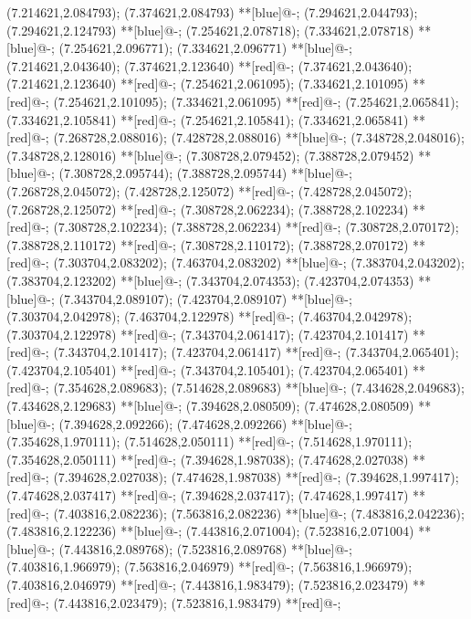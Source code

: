(7.214621,2.084793); (7.374621,2.084793) **[blue]@{-};
(7.294621,2.044793); (7.294621,2.124793) **[blue]@{-};
(7.254621,2.078718); (7.334621,2.078718) **[blue]@{-};
(7.254621,2.096771); (7.334621,2.096771) **[blue]@{-};
(7.214621,2.043640); (7.374621,2.123640) **[red]@{-};
(7.374621,2.043640); (7.214621,2.123640) **[red]@{-};
(7.254621,2.061095); (7.334621,2.101095) **[red]@{-};
(7.254621,2.101095); (7.334621,2.061095) **[red]@{-};
(7.254621,2.065841); (7.334621,2.105841) **[red]@{-};
(7.254621,2.105841); (7.334621,2.065841) **[red]@{-};
(7.268728,2.088016); (7.428728,2.088016) **[blue]@{-};
(7.348728,2.048016); (7.348728,2.128016) **[blue]@{-};
(7.308728,2.079452); (7.388728,2.079452) **[blue]@{-};
(7.308728,2.095744); (7.388728,2.095744) **[blue]@{-};
(7.268728,2.045072); (7.428728,2.125072) **[red]@{-};
(7.428728,2.045072); (7.268728,2.125072) **[red]@{-};
(7.308728,2.062234); (7.388728,2.102234) **[red]@{-};
(7.308728,2.102234); (7.388728,2.062234) **[red]@{-};
(7.308728,2.070172); (7.388728,2.110172) **[red]@{-};
(7.308728,2.110172); (7.388728,2.070172) **[red]@{-};
(7.303704,2.083202); (7.463704,2.083202) **[blue]@{-};
(7.383704,2.043202); (7.383704,2.123202) **[blue]@{-};
(7.343704,2.074353); (7.423704,2.074353) **[blue]@{-};
(7.343704,2.089107); (7.423704,2.089107) **[blue]@{-};
(7.303704,2.042978); (7.463704,2.122978) **[red]@{-};
(7.463704,2.042978); (7.303704,2.122978) **[red]@{-};
(7.343704,2.061417); (7.423704,2.101417) **[red]@{-};
(7.343704,2.101417); (7.423704,2.061417) **[red]@{-};
(7.343704,2.065401); (7.423704,2.105401) **[red]@{-};
(7.343704,2.105401); (7.423704,2.065401) **[red]@{-};
(7.354628,2.089683); (7.514628,2.089683) **[blue]@{-};
(7.434628,2.049683); (7.434628,2.129683) **[blue]@{-};
(7.394628,2.080509); (7.474628,2.080509) **[blue]@{-};
(7.394628,2.092266); (7.474628,2.092266) **[blue]@{-};
(7.354628,1.970111); (7.514628,2.050111) **[red]@{-};
(7.514628,1.970111); (7.354628,2.050111) **[red]@{-};
(7.394628,1.987038); (7.474628,2.027038) **[red]@{-};
(7.394628,2.027038); (7.474628,1.987038) **[red]@{-};
(7.394628,1.997417); (7.474628,2.037417) **[red]@{-};
(7.394628,2.037417); (7.474628,1.997417) **[red]@{-};
(7.403816,2.082236); (7.563816,2.082236) **[blue]@{-};
(7.483816,2.042236); (7.483816,2.122236) **[blue]@{-};
(7.443816,2.071004); (7.523816,2.071004) **[blue]@{-};
(7.443816,2.089768); (7.523816,2.089768) **[blue]@{-};
(7.403816,1.966979); (7.563816,2.046979) **[red]@{-};
(7.563816,1.966979); (7.403816,2.046979) **[red]@{-};
(7.443816,1.983479); (7.523816,2.023479) **[red]@{-};
(7.443816,2.023479); (7.523816,1.983479) **[red]@{-};
